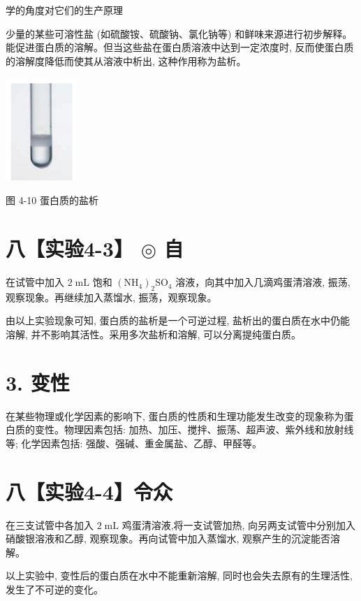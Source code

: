 \documentclass[10pt]{article}
\begin{document}
学的角度对它们的生产原理

少量的某些可溶性盐 (如硫酸铵、硫酸钠、氯化钠等) 和鲜味来源进行初步解释。 能促进蛋白质的溶解。但当这些盐在蛋白质溶液中达到一定浓度时, 反而使蛋白质的溶解度降低而使其从溶液中析出, 这种作用称为盐析。

\begin{center}
\includegraphics[max width=0.2\textwidth]{images/0190efc5-b58a-7c43-bfb0-e0a030df9cfd_120_289927.jpg}
\end{center}

图 4-10 蛋白质的盐析

\section*{八【实验4-3】 \(\circledcirc\) 自}

在试管中加入 \(2\mathrm{\;{mL}}\) 饱和 \({\left( {\mathrm{{NH}}}_{4}\right) }_{2}{\mathrm{{SO}}}_{4}\) 溶液，向其中加入几滴鸡蛋清溶液, 振荡, 观察现象。再继续加入蒸馏水, 振荡，观察现象。

由以上实验现象可知, 蛋白质的盐析是一个可逆过程, 盐析出的蛋白质在水中仍能溶解, 并不影响其活性。采用多次盐析和溶解, 可以分离提纯蛋白质。

\section*{3. 变性}

在某些物理或化学因素的影响下, 蛋白质的性质和生理功能发生改变的现象称为蛋白质的变性。物理因素包括: 加热、加压、搅拌、振荡、超声波、紫外线和放射线等; 化学因素包括: 强酸、强碱、重金属盐、乙醇、甲醛等。

\section*{八【实验4-4】令众}

在三支试管中各加入 \(2\mathrm{\;{mL}}\) 鸡蛋清溶液,将一支试管加热, 向另两支试管中分别加入硝酸银溶液和乙醇, 观察现象。再向试管中加入蒸馏水, 观察产生的沉淀能否溶解。

以上实验中, 变性后的蛋白质在水中不能重新溶解, 同时也会失去原有的生理活性, 发生了不可逆的变化。
\end{document}
